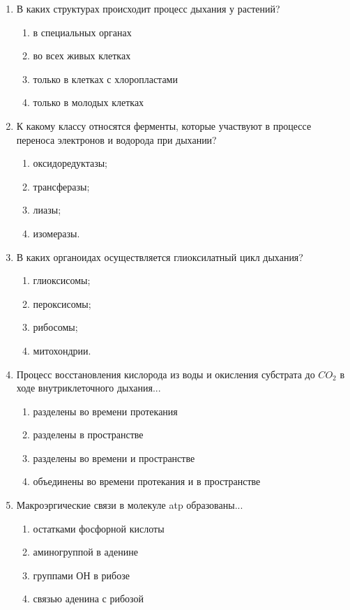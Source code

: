 \begin{enumerate}

\item В каких структурах происходит процесс дыхания у растений?
\begin{enumerate}
	\item в специальных органах                     
	\item во всех живых клетках
	\item только в клетках с хлоропластами   
	\item только в молодых клетках
\end{enumerate}

\item К какому классу относятся ферменты, которые участвуют в процессе переноса электронов и водорода при дыхании?
\begin{enumerate}
	\item оксидоредуктазы; 
	\item трансферазы; 
	\item лиазы; 
	\item изомеразы.
\end{enumerate}

\item В каких органоидах осуществляется глиоксилатный цикл дыхания?
\begin{enumerate}
	\item глиоксисомы; 
	\item пероксисомы; 
	\item рибосомы; 
	\item митохондрии.
\end{enumerate}

\item Процесс восстановления кислорода из воды и окисления субстрата до $CO_{2}$ в ходе внутриклеточного дыхания...
\begin{enumerate}
	\item разделены во времени протекания
	\item разделены в пространстве
	\item разделены во времени и пространстве
	\item объединены во времени протекания и в пространстве
\end{enumerate}

\item Макроэргические связи в молекуле \gls{atp} образованы...
\begin{enumerate}
	\item остатками фосфорной кислоты        
	\item аминогруппой в аденине
	\item группами ОН в рибозе                       
	\item связью аденина с рибозой
\end{enumerate}


\end{enumerate}
